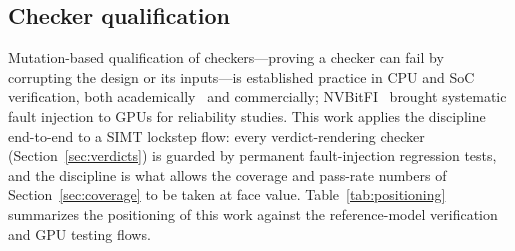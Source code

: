 \documentclass[conference]{IEEEtran}
\begin{document}
\subsection{Checker qualification}
Mutation-based qualification of checkers---proving a checker can fail by
corrupting the design or its inputs---is established practice in CPU and
SoC verification, both academically~\cite{vacuity-date10} and
commercially; NVBitFI~\cite{nvbitfi} brought systematic fault injection
to GPUs for reliability studies. This work applies the discipline
end-to-end to a SIMT lockstep flow: every verdict-rendering checker
(Section~\ref{sec:verdicts}) is guarded by permanent fault-injection
regression tests, and the discipline is what allows the coverage and
pass-rate numbers of Section~\ref{sec:coverage} to be taken at face
value. Table~\ref{tab:positioning} summarizes the positioning of this
work against the reference-model verification and GPU testing flows.
\end{document}
